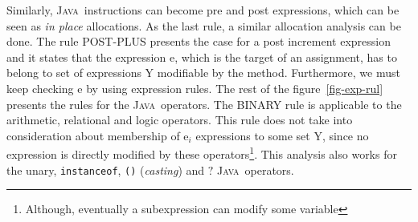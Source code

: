 \documentclass[a4paper]{llncs}
\newcommand{\java}{\textsc{Java}}
\begin{document}
Similarly, \java~instructions can become pre and post expressions,
which can be seen as \emph{in place} allocations. As the last rule,
a similar allocation analysis can be done. The rule \textup{POST-PLUS}
presents the case for a post increment expression and it states that
the expression \textup{e}, which is the target of an assignment, has
to belong to
set of expressions \textup{Y} modifiable by the method. Furthermore,
we must keep checking \textup{e} by using expression rules. The rest
of the figure~\ref{fig-exp-rul} presents the
rules for the \java~operators. The \textup{BINARY} rule is applicable
to the arithmetic, relational and logic operators. This rule
does not take into consideration about membership of \textup{e}$_i$
expressions to some set \textsc{Y}, 
since no expression is directly modified by these
operators\footnote{Although, eventually a subexpression can modify
some variable}. This analysis also works for the unary,
\texttt{instanceof}, \texttt{()} (\emph{casting}) and $?$
\java~operators.
\end{document}
